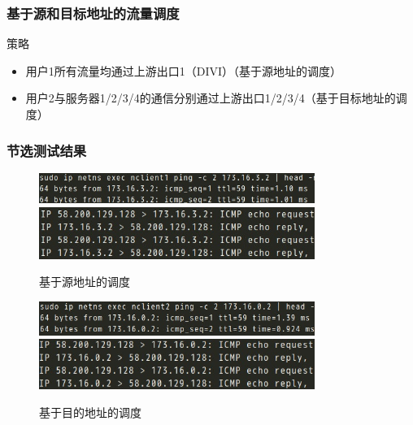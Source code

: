 \documentclass{beamer}
\begin{document}
\begin{frame}
  \frametitle{基于源和目标地址的流量调度}

  \begin{block}{策略}
    \begin{itemize}
    \item 用户1所有流量均通过上游出口1（DIVI）（基于源地址的调度）
    \item 用户2与服务器1/2/3/4的通信分别通过上游出口1/2/3/4（基于目标地址的调度）
    \end{itemize}
  \end{block}
\end{frame}

\begin{frame}
  \frametitle{节选测试结果}

  \begin{figure}
    \includegraphics[width=0.8\textwidth]{figs/c1-s4-ping.jpeg}\\
    \includegraphics[width=0.8\textwidth]{figs/c1-s4-pdump.jpeg}
    \caption{基于源地址的调度}
  \end{figure}

  \vspace{-1em}

  \begin{figure}
    \includegraphics[width=0.8\textwidth]{figs/c2-s1-ping.jpeg}\\
    \includegraphics[width=0.8\textwidth]{figs/c2-s1-pdump.jpeg}
    \caption{基于目的地址的调度}
  \end{figure}
\end{frame}
\end{document}
